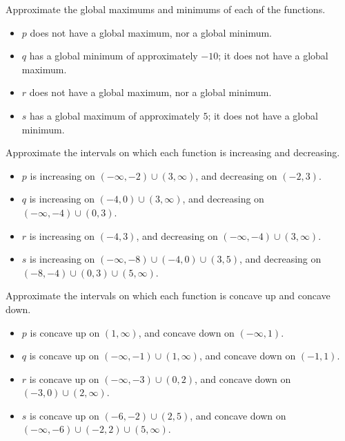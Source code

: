 \begin{exercises}
\begin{problem}
\begin{subproblem}
	Approximate the global maximums and minimums of each of the functions.
	\begin{shortsolution}
		\begin{itemize}
			\item $p$ does not have a global maximum, nor a global minimum.
			\item $q$ has a global minimum of approximately $-10$; it does not have a global maximum.
			\item $r$ does not have a global maximum, nor a global minimum.
			\item $s$ has a global maximum of approximately $5$; it does not have a global minimum.
		\end{itemize}
	\end{shortsolution}
\end{subproblem}
\begin{subproblem}
	Approximate the intervals on which each function is increasing and decreasing.
	\begin{shortsolution}
		\begin{itemize}
			\item $p$ is increasing on $(-\infty,-2)\cup (3,\infty)$, and decreasing on $(-2,3)$.
			\item $q$ is increasing on $(-4,0)\cup (3,\infty)$, and decreasing on $(-\infty,-4)\cup (0,3)$.
			\item $r$ is increasing on $(-4,3)$, and decreasing on $(-\infty,-4)\cup (3,\infty)$.
			\item $s$ is increasing on $(-\infty,-8)\cup (-4,0)\cup (3,5)$, and decreasing on $(-8,-4)\cup (0,3)\cup (5,\infty)$.
		\end{itemize}
	\end{shortsolution}
\end{subproblem}
\begin{subproblem}
	Approximate the intervals on which each function is concave up and concave down.
	\begin{shortsolution}
		\begin{itemize}
			\item $p$ is concave up on  $(1,\infty)$, and concave down on  $(-\infty,1)$.
			\item $q$ is concave up on $(-\infty,-1)\cup (1,\infty)$, and concave down on $(-1,1)$.
			\item $r$ is concave up on $(-\infty,-3)\cup (0,2)$, and concave down on $(-3,0)\cup (2,\infty)$.
			\item $s$ is concave up on $(-6,-2)\cup (2,5)$, and concave down on $(-\infty,-6)\cup (-2,2)\cup (5,\infty)$.

\end{itemize}
\end{shortsolution}
\end{subproblem}
\end{problem}
\end{exercises}
